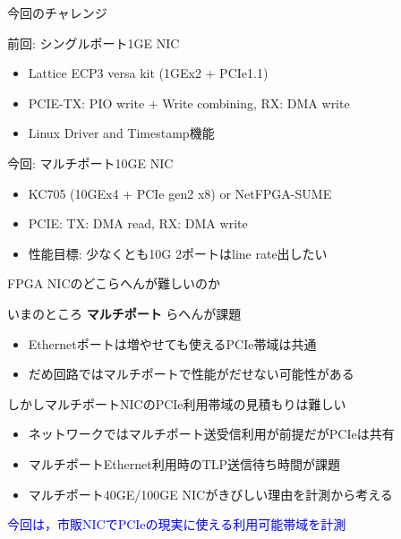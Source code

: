 \documentclass[10pt, compress]{beamer}
\begin{document}

\begin{frame}[fragile,t]{今回のチャレンジ}

前回: シングルポート1GE NIC
\vspace{-.5em}
\begin{itemize}
\item Lattice ECP3 versa kit (1GEx2 + PCIe1.1)
\item PCIE-TX: PIO write + Write combining, RX: DMA write
\item Linux Driver and Timestamp機能
\end{itemize}

\vspace{1em}

今回: マルチポート10GE NIC
\vspace{-.5em}
\begin{itemize}
\item KC705 (10GEx4 + PCIe gen2 x8) or NetFPGA-SUME
\item PCIE: TX: DMA read, RX: DMA write
\item 性能目標: 少なくとも10G 2ポートはline rate出したい
\end{itemize}

\end{frame}


\begin{frame}[fragile,t]{FPGA NICのどこらへんが難しいのか}

いまのところ \textbf{マルチポート} らへんが課題
\vspace{-.5em}
\begin{itemize}
\item Ethernetポートは増やせても使えるPCIe帯域は共通
\item だめ回路ではマルチポートで性能がだせない可能性がある
\end{itemize}

\vspace{.5em}

しかしマルチポートNICのPCIe利用帯域の見積もりは難しい
\vspace{-.5em}
\begin{itemize}
\item ネットワークではマルチポート送受信利用が前提だがPCIeは共有
\item マルチポートEthernet利用時のTLP送信待ち時間が課題
\item マルチポート40GE/100GE NICがきびしい理由を計測から考える
\end{itemize}

\textcolor{blue}{今回は，市販NICでPCIeの現実に使える利用可能帯域を計測}

\end{frame}
\end{document}
